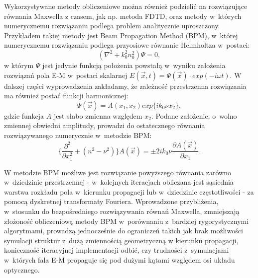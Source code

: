 Wykorzystywane metody obliczeniowe można również podzielić na rozwiązujące równania Maxwella z czasem, jak np. metoda FDTD, oraz metody w~których numerycznemu rozwiązaniu podlega problem analitycznie uproszczony. Przykładem takiej metody jest Beam Propagation Method (BPM), w~której numerycznemu rozwiązaniu podlega przyosiowe równanie Helmholtza w~postaci:
\begin{equation}
 ( \nabla ^2 + k_0^2 n_0^2) \Psi = 0,
\end{equation}
w którym $\Psi$ jest jedynie funkcją położenia powstałą w~wyniku założenia rozwiązań pola E-M w~postaci skalarnej $E(\vec{x},t)=\Psi(\vec{x})\cdot exp(-i\omega t)$. W dalszej części wyprowadzenia zakładamy, że zależność przestrzenna rozwiązania ma również postać funkcji harmonicznej:
\begin{equation}
\Psi(\vec{x})=A(x_1,x_2) exp\{ik_0\nu x_2\}, 
\end{equation}
gdzie funkcja $A$ jest słabo zmienna względem $x_2$. Podane założenie, o~wolno zmiennej obwiedni amplitudy, prowadzi do ostatecznego równania rozwiązywanego numerycznie w~metodzie BPM:
\begin{equation}
 \{  \frac{\partial^2 }{\partial x_1^2 } + (n^2 - \nu^2) \} A(\vec{x}) = \pm  2ik_0\nu \frac{\partial A (\vec{x})}{\partial x_1}.
\end{equation}

W metodzie BPM możliwe jest rozwiązanie powyższego równania zarówno w~dziedzinie przestrzennej - w~kolejnych iteracjach obliczana jest sąsiednia warstwa rozkładu pola w~kierunku propagacji lub w~dziedzinie częstotliwości - za pomocą dyskretnej transformaty Fouriera. Wprowadzone przybliżenia, w~stosunku do bezpośredniego rozwiązywania równań Maxwella, zmniejszają złożoność obliczeniową metody BPM w~porównaniu z~bardziej rygorystycznymi algorytmami, prowadzą jednocześnie do ograniczeń takich jak brak możliwości symulacji struktur z~dużą zmiennością geometryczną w kierunku propagacji, konieczność iteracyjnej implementacji odbić, czy trudności z~symulacjami w~których fala E-M propaguje się pod dużymi kątami względem osi układu optycznego.



 
